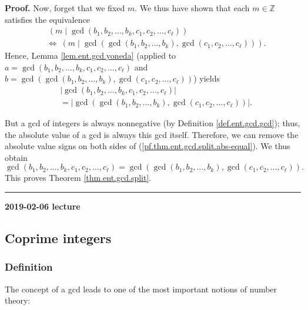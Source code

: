 \documentclass[numbers=enddot,12pt,final,onecolumn,notitlepage]{scrartcl}%
\numberwithin{exer}{subsection}
\theoremstyle{definition}
\newenvironment{proof}[1][Proof]{\noindent\textbf{#1.} }{\ \rule{0.5em}{0.5em}}
\begin{document}
\begin{proof}
Now, forget that we fixed $m$. We thus have shown that each $m\in\mathbb{Z}$
satisfies the equivalence%
\begin{align*}
&  \ \left(  m\mid\gcd\left(  b_{1},b_{2},\ldots,b_{k},c_{1},c_{2}%
,\ldots,c_{\ell}\right)  \right) \\
&  \Longleftrightarrow\ \left(  m\mid\gcd\left(  \gcd\left(  b_{1}%
,b_{2},\ldots,b_{k}\right)  ,\gcd\left(  c_{1},c_{2},\ldots,c_{\ell}\right)
\right)  \right)  .
\end{align*}
Hence, Lemma \ref{lem.ent.gcd.yoneda} (applied to $a=\gcd\left(  b_{1}%
,b_{2},\ldots,b_{k},c_{1},c_{2},\ldots,c_{\ell}\right)  $ and \newline%
$b=\gcd\left(  \gcd\left(  b_{1},b_{2},\ldots,b_{k}\right)  ,\gcd\left(
c_{1},c_{2},\ldots,c_{\ell}\right)  \right)  $) yields%
\begin{align}
&  \left\vert \gcd\left(  b_{1},b_{2},\ldots,b_{k},c_{1},c_{2},\ldots,c_{\ell
}\right)  \right\vert \nonumber\\
&  =\left\vert \gcd\left(  \gcd\left(  b_{1},b_{2},\ldots,b_{k}\right)
,\gcd\left(  c_{1},c_{2},\ldots,c_{\ell}\right)  \right)  \right\vert .
\label{pf.thm.ent.gcd.split.abs-equal}%
\end{align}


But a gcd of integers is always nonnegative (by Definition
\ref{def.ent.gcd.gcd}); thus, the absolute value of a gcd is always this gcd
itself. Therefore, we can remove the absolute value signs on both sides of
(\ref{pf.thm.ent.gcd.split.abs-equal}). We thus obtain%
\[
\gcd\left(  b_{1},b_{2},\ldots,b_{k},c_{1},c_{2},\ldots,c_{\ell}\right)
=\gcd\left(  \gcd\left(  b_{1},b_{2},\ldots,b_{k}\right)  ,\gcd\left(
c_{1},c_{2},\ldots,c_{\ell}\right)  \right)  .
\]
This proves Theorem \ref{thm.ent.gcd.split}.
\end{proof}

\begin{center}
\textbf{2019-02-06 lecture}
\end{center}

\subsection{Coprime integers}

\subsubsection{Definition}

The concept of a gcd leads to one of the most important notions of number theory:
\end{document}
